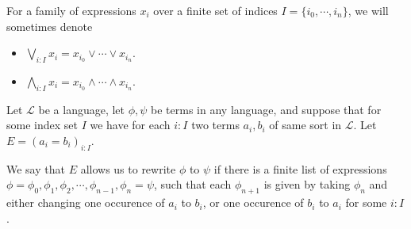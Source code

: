 \documentclass{../util/zariski-small}
\begin{document}
\begin{remark}
  For a family of expressions $x_i$ over a 
  finite set of indices $I = \{i_0, \cdots, i_n\}$, we will sometimes denote 
  \begin{itemize}
    \item $\bigvee_{i:I} x_i = x_{i_0} \vee \cdots \vee x_{i_n}$. 
    \item $\bigwedge_{i:I} x_i = x_{i_0} \wedge \cdots \wedge x_{i_n}$. 
  \end{itemize}
\end{remark}

\begin{definition}
  Let $\mathcal L$ be a language, 
  let $\phi,\psi$ be terms in any language,
  and suppose that for some index set $I$ we have 
  for each $i:I$ two terms $a_i,b_i$ of same sort in $\mathcal L$. 
  Let $E= (a_i = b_i)_{i:I}$. 

  We say that $E$ allows us to rewrite $\phi$ to $\psi$ if there is a finite list of expressions 
  $\phi = \phi_0 , \phi_1, \phi_2, \cdots, \phi_{n-1}, \phi_n = \psi$, 
  such that each $\phi_{n+1}$ is given by taking $\phi_n$ and either changing one occurence of $a_i$ to  $b_i$, 
  or one occurence of $b_i$ to $a_i$ for some $i:I$. 
\end{definition}
\end{document}
